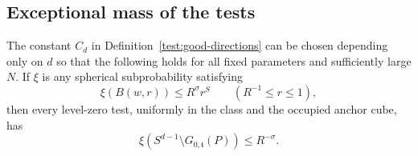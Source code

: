 \subsection{Exceptional mass of the tests}

\begin{lemma}\label{test:exceptional-directions}
The constant $C_d$ in Definition~\ref{test:good-directions} can be
chosen depending only on $d$ so that the following holds for all fixed
parameters and sufficiently large $N$.  If $\xi$ is any spherical
subprobability satisfying
\[
\xi(B(w,r))\le R^\sigma r^S
       \qquad(R^{-1}\le r\le1),
\]
then every level-zero test, uniformly in the class and the occupied
anchor cube, has
\begin{equation}\label{test:exceptional-bound}
\xi(S^{d-1}\setminus G_{0,\mathfrak t}(P))\le R^{-\sigma}.
\end{equation}
\end{lemma}

